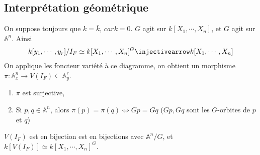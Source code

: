         \subsection{Interprétation géométrique}
            On suppose toujours que $k = \bar k$, $car k = 0$. $G$ agit sur $k[X_1, \cdots, X_n]$, et $G$ agit sur $\mathbb{A}^n$.  Ainsi
            \begin{align*}
                k[y_1, \cdots, y_r]/I_F \simeq k[X_1, \cdots, X_n]^G \injectivearrow k[X_1, \cdots, X_n]
            \end{align*}
            On applique les foncteur variété à ce diagramme, on obtient un morphisme $\pi : \mathbb{A}^n_x \to V(I_F) \subseteq \mathbb{A}^r_y$.
            \begin{theo}
                \begin{enumerate}
                    \item $\pi$ est surjective,
                    \item Si $p,q \in \mathbb{A}^n$, alors $\pi(p) = \pi(q) \iff Gp = Gq$ ($Gp,Gq$ sont les $G$-orbites de $p$ et $q$)
                \end{enumerate}
            \end{theo}
            \begin{remq}
                $V(I_F)$ est en bijection est en bijections avec $\mathbb{A}^n/G$, et $k[V(I_F)] \simeq k[X_1, \cdots, X_n]^G$.
            \end{remq}
